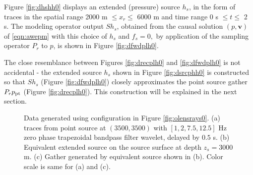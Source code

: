 \documentclass[12pt]{geophysics}
\newcommand{\bv}{\mathbf{v}}
\begin{document}
Figure \ref{fig:dhshh0} displays an extended (pressure) source $h_s$, in the form of
traces in the spatial range 2000 m $ \le x_r \le $ 6000 m and time
range 0 s $\le t \le $ 2 s. The modeling operator output $Sh_s$,
obtained from the causal solution $(p, \bv)$ of \ref{eqn:awepm}
with this choice of $h_s$ and $f_s=0,$ by application of the sampling
operator $P_r$ to $p$, is shown in Figure \ref{fig:dfwdplh0}.

 The close resemblance between Figures
\ref{fig:drecplh0} and \ref{fig:dfwdplh0} is not accidental  - the
extended source $h_ s$ shown in Figure \ref{fig:dsrcphh0} is constructed
so that $Sh_s$ (Figure \ref{fig:dfwdplh0}) closely
approximates the point source gather $P_r p_{\rm pt}$ (Figure
\ref{fig:drecplh0}). This construction will be explained in the next section.

\begin{figure}
  \centering
  \caption{Data generated using configuration in Figure
    \ref{fig:olensrays0}. (a) traces from point source at $(3500,3500)$
    with $[1, 2, 7.5, 12.5]$ Hz zero phase trapezoidal bandpass
    filter wavelet, delayed by $0.5$ s. (b) Equivalent extended source on
    the source surface at depth $z_s=3000$ m. (c) Gather generated by
    equivalent source shown in (b). Color scale is same for (a) and (c).}
\end{figure}
\end{document}
